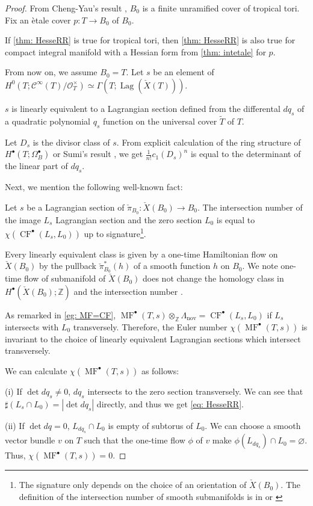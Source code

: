 \documentclass[a4paper,dvipdfmx,reqno,12pt]{amsart}
\theoremstyle{definition}
\newcommand{\emp}{\varnothing}%
\newcommand{\Z}{\mathbb{Z}}%
\newcommand{\mcal}[1]{\mathcal{#1}}%
\newcommand{\opn}[1]{\operatorname{#1}}
\numberwithin{equation}{section}
\begin{document}
\begin{proof}

From Cheng-Yau's result \cite{MR714338}, $B_0$ is a finite unramified cover of tropical tori.
Fix an \`etale cover $p:T \to B_0$ of $B_0$.

If \cref{thm: HesseRR} is true for tropical tori,
then \cref{thm: HesseRR} is also true for compact
integral manifold with a Hessian form from
\cref{thm: intetale} for $p$.

From now on, we assume $B_0=T$.
Let $s$ be an element of 
$H^{0}(T;\mcal{C}^{\infty}(T)/\mcal{O}_{T}^{\times})\simeq
\Gamma(T;\opn{Lag}(\check{X}(T)))$.

$s$ is linearly equivalent to a Lagrangian section
defined from the differental $dq_s$ of a quadratic polynomial
$q_s$ function on the universal cover $\tilde{T}$ of $T$.

Let $D_s$ is the divisor class of $s$.
From explicit calculation of the ring structure of
$H^{\bullet}(T;\Omega_B^{\bullet})$ or Sumi's result
\cite[Theorem 47]{MR4229604}, we get 
$\frac{1}{n!}c_1(D_s)^{n}$ is equal to the determinant
of the linear part of $dq_s$.

Next, we mention the following well-known fact:

Let $s$ be a Lagrangian section of 
$\check{\pi}_{B_0}\colon \check{X}(B_0) \to B_0$.
The intersection number of the image $L_s$ Lagrangian
section and the zero section $L_0$ is equal to
$\chi(\opn{CF}^{\bullet}(L_s,L_0))$ up to 
signature\footnote{The signature only depends on
the choice of 
an orientation of $\check{X}(B_0)$. 
The definition of the intersection number of smooth 
submanifolds is in \cite[5.2]{MR1336822} or 
\cite[0.4]{griffithsPrinciplesAlgebraicGeometry1994a}}. 

Every linearly equivalent 
class is given by a one-time Hamiltonian flow on 
$\check{X}(B_0)$ by the pullback $\check{\pi}_{B_0}^{*}(h)$
of a smooth function $h$ on $B_0$.
We note one-time flow of submanifold of $\check{X}(B_0)$ does not change
the homology class in $H^{\bullet}(\check{X}(B_0);\Z)$ and
the intersection number \cite[5.2.1. Theorem]{MR1336822}.

As remarked in \cref{eg: MF=CF}, 
$\opn{MF}^{\bullet}(T,s)\otimes_{\Z}\Lambda_{\opn{nov}}
=\opn{CF}^{\bullet}(L_s,L_0)$ if $L_s$ intersects with
$L_0$ transversely. Therefore, 
the Euler number $\chi(\opn{MF}^{\bullet}(T,s))$ is 
invariant to the choice of linearly equivalent 
Lagrangian sections which intersect transversely.

We can calculate $\chi(\opn{MF}^{\bullet}(T,s))$ as follows:

(i) If $\det dq_s\ne 0$, $dq_s$ intersects to 
the zero section transversely. We can see that 
$\sharp(L_s\cap L_0)=|\det dq_s|$ directly, and thus
we get \cref{eq: HesseRR}. 

(ii) If $\det dq=0$, $L_{dq_s}\cap L_0$ is empty of 
subtorus of $L_0$. We can choose a smooth vector bundle $v$ on 
$T$ such that the one-time flow $\phi$ of $v$ make 
$\phi(L_{dq_s})\cap L_0=\emp$. 
Thus, $\chi(\opn{MF}^{\bullet}(T,s))=0$.



\end{proof}
\end{document}
